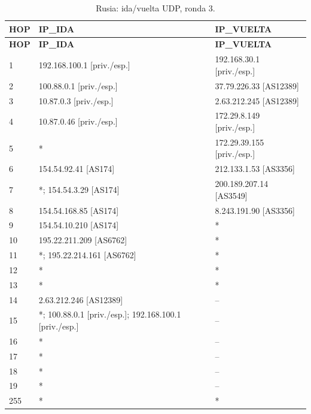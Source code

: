 \endgroup
\begingroup
\fontsize{9}{11}\selectfont
\begin{longtable}{p{0.95cm}p{7.075cm}p{7.075cm}}
\caption{Rusia: ida/vuelta UDP, ronda 3.}\label{anexo:vuelta:37.79.226.46:UDP:3} \\
\toprule
\textbf{HOP} & \textbf{IP\_\allowbreak{}IDA} & \textbf{IP\_\allowbreak{}VUELTA} \\ \midrule
\endfirsthead
\toprule
\textbf{HOP} & \textbf{IP\_\allowbreak{}IDA} & \textbf{IP\_\allowbreak{}VUELTA} \\ \midrule
\endhead
1 & 192.168.100.1 [priv./esp.] & 192.168.30.1 [priv./esp.] \\
2 & 100.88.0.1 [priv./esp.] & 37.79.226.33 [AS12389] \\
3 & 10.87.0.3 [priv./esp.] & 2.63.212.245 [AS12389] \\
4 & 10.87.0.46 [priv./esp.] & 172.29.8.149 [priv./esp.] \\
5 & * & 172.29.39.155 [priv./esp.] \\
6 & 154.54.92.41 [AS174] & 212.133.1.53 [AS3356] \\
7 & *; 154.54.3.29 [AS174] & 200.189.207.14 [AS3549] \\
8 & 154.54.168.85 [AS174] & 8.243.191.90 [AS3356] \\
9 & 154.54.10.210 [AS174] & * \\
10 & 195.22.211.209 [AS6762] & * \\
11 & *; 195.22.214.161 [AS6762] & * \\
12 & * & * \\
13 & * & * \\
14 & 2.63.212.246 [AS12389] & -- \\
15 & *; 100.88.0.1 [priv./esp.]; 192.168.100.1 [priv./esp.] & -- \\
16 & * & -- \\
17 & * & -- \\
18 & * & -- \\
19 & * & -- \\
255 & * & * \\
\bottomrule
\end{longtable}
\endgroup
\begingroup
\fontsize{9}{11}\selectfont
